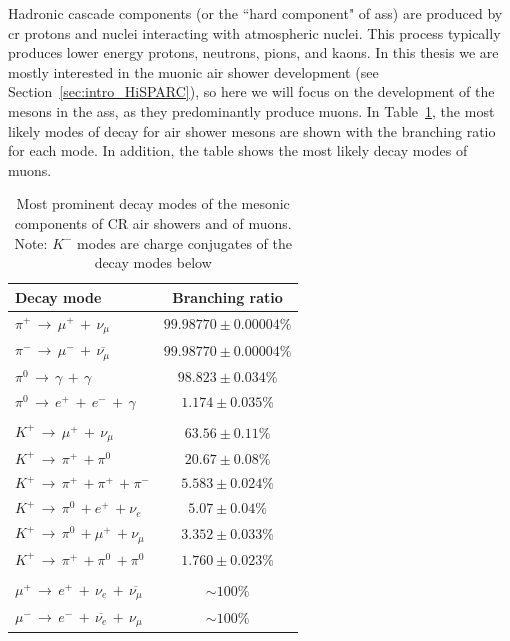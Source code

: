 Hadronic cascade components (or the ``hard component" of \glspl{as}) are produced by \gls{cr} protons and nuclei interacting with atmospheric nuclei. This process typically produces lower energy protons, neutrons, pions, and kaons. In this thesis we are mostly interested in the muonic air shower development (see Section~\ref{sec:intro_HiSPARC}), so here we will focus on the development of the mesons in the \glspl{as}, as they predominantly produce muons. In Table~\ref{tab:meson_decay}, the most likely modes of decay for air shower mesons are shown with the branching ratio for each mode. In addition, the table shows the most likely decay modes of muons.


\begin{table}[ht!]
	\begin{center}
		\caption{ Most prominent decay modes of the mesonic components of CR air showers and of muons. Note: $K^-$ modes are charge conjugates of the decay modes below \citep{particle_data_group_review_2020}}
		\label{tab:meson_decay}
		\begin{tabular}{lc}
			\hline
			Decay mode & Branching ratio  \\
			\hline
			{$ \pi^{+} \, \rightarrow \, \mu^{+} \, + \, \nu_{\mu} $}	 &  $99.98770 \pm 0.00004 \%$ \\
			{$ \pi^{-} \, \rightarrow \, \mu^{-} \, + \, \overline{\nu_{\mu}} $}  &  $99.98770 \pm 0.00004 \% $ \\
			{$ \pi^{0} \, \rightarrow \, \gamma \, + \, \gamma $} &  $98.823 \pm 0.034 \% $ \\
			{$ \pi^{0} \, \rightarrow \, e^+ \, + \, e^-  \, + \, \gamma $} &  $1.174 \pm 0.035 \% $ \\
			{}  & {} \\
			{$K^+ \, \rightarrow \, \mu^{+} \, + \, \nu_{\mu}$}  &  $63.56 \pm 0.11 \% $ \\
			{$K^+ \, \rightarrow \, \pi^{+} \, + \pi^{0} $}  &  $20.67 \pm 0.08 \% $ \\
			{$K^+ \, \rightarrow \, \pi^{+} \, + \pi^{+} \, + \pi^{-}$}  &  $5.583 \pm 0.024 \% $ \\
			{$K^+ \, \rightarrow \, \pi^{0} \, + e^{+} \, + \nu_{e}$}  & $5.07 \pm 0.04 \% $ \\ 		 		 		 		
			{$K^+ \, \rightarrow \, \pi^{0} \, + \mu^{+} \, + \nu_{\mu}$}  &  $3.352 \pm 0.033 \% $\\ 		 		 		 		
			{$K^+ \, \rightarrow \, \pi^{+} \, + \pi^{0} \, + \pi^{0}$}  &  $1.760 \pm 0.023 \% $\\
			{}  & {} \\
			{$ \mu^{+} \, \rightarrow \, e^{+} \, + \, \nu_e \, + \, \overline{\nu_{\mu}} $}  &  $\sim$$100\%$\\	
			{$ \mu^{-} \, \rightarrow \, e^{-} \, + \, \overline{\nu_e} \, + \, \nu_{\mu} $}  &  $\sim$$100\%$\\	
			\hline
		\end{tabular}
	\end{center}
\end{table}


